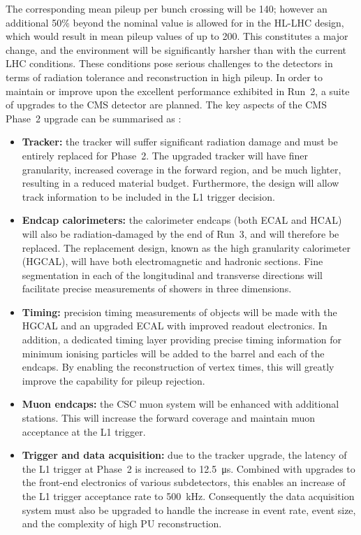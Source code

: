 The corresponding mean pileup per bunch crossing will be 140; however an additional 50\% beyond the nominal value is allowed for in the HL-LHC design, 
which would result in mean pileup values of up to 200.
This constitutes a major change, and the environment will be significantly harsher than with the current LHC conditions.
These conditions pose serious challenges to the detectors in terms of radiation tolerance and reconstruction in high pileup.
In order to maintain or improve upon the excellent performance exhibited in Run~2, a suite of upgrades to the CMS detector are planned.
The key aspects of the CMS Phase~2 upgrade can be summarised as \cite{UpgradeTP,MTD}:
\begin{itemize}
  \item{\textbf{Tracker:}
  the tracker will suffer significant radiation damage and must be entirely replaced for Phase~2.
  The upgraded tracker will have finer granularity, %
  increased coverage in the forward region, %
  and be much lighter, resulting in a reduced material budget.
  Furthermore, the design will allow track information to be included in the L1 trigger decision.}
  \item{\textbf{Endcap calorimeters:}
  the calorimeter endcaps (both ECAL and HCAL) will also be radiation-damaged by the end of Run~3, and will therefore be replaced.
  The replacement design, known as the high granularity calorimeter (HGCAL), will have both electromagnetic and hadronic sections.
  Fine segmentation in each of the longitudinal and transverse directions will facilitate precise measurements of showers in three dimensions.}
  \item{\textbf{Timing:}
  precision timing measurements of objects will be made with the HGCAL and an upgraded ECAL with improved readout electronics.
  In addition, a dedicated timing layer providing precise timing information for minimum ionising particles will be added to the barrel and each of the endcaps.
  By enabling the reconstruction of vertex times, this will greatly improve the capability for pileup rejection.}
  \item{\textbf{Muon endcaps:}
  the CSC muon system will be enhanced with additional stations.
  This will increase the forward coverage and maintain muon acceptance at the L1 trigger.}
  \item{\textbf{Trigger and data acquisition:}
  due to the tracker upgrade, the latency of the L1 trigger at Phase~2 is increased to \SI{12.5}{\micro\second}.
  Combined with upgrades to the front-end electronics of various subdetectors, %
  this enables an increase of the L1 trigger acceptance rate to \SI{500}{\kilo\hertz}.
  Consequently the data acquisition system must also be upgraded to handle the increase in event rate, event size, and the complexity of high PU reconstruction.}
\end{itemize}
